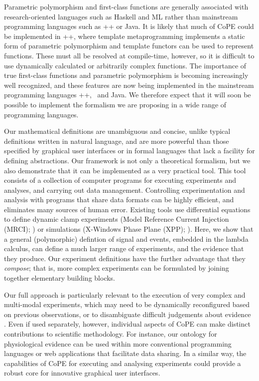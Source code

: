 Parametric polymorphism and first-class functions are generally
associated with research-oriented languages such as Haskell and ML
rather than mainstream programming languages such as \C++ or Java. It
is likely that much of CoPE could be implemented in \C++, where
template metaprogramming implements a static form of parametric
polymorphism and template functors can be used to represent
functions. These must all be resolved at compile-time, however, so it
is difficult to use dynamically calculated or arbitrarily complex
functions. The importance of true first-class functions and parametric
polymorphism is becoming increasingly well recognized, and these
features are now being implemented in the mainstream programming
languages \C++, \Csharp\, and Java. We therefore expect that it will
soon be possible to implement the formalism we are proposing in a wide
range of programming languages.

%
% 
%
Our mathematical definitions are unambiguous and concise, unlike
typical definitions written in natural language, and are more powerful
than those specified by graphical user interfaces or in formal
languages that lack a facility for defining abstractions. Our
framework is not only a theoretical formalism, but we also demonstrate
that it can be implemented as a very practical tool. This tool
consists of a collection of computer programs for executing
experiments and analyses, and carrying out data
management. Controlling experimentation and analysis with programs
that share data formats can be highly efficient, and eliminates many
sources of human error. Existing tools use differential equations to
define dynamic clamp experiments (Model Reference Current Injection
(MRCI); \citep{Raikov2004}) or simulations (X-Windows Phase Plane
(XPP); \citep{Ermentrout1987}). Here, we show that a general
(polymorphic) defintion of signal and events, embedded in the lambda
calculus, can define a much larger range of experiments, and the
evidence that they produce. Our experiment definitions have the
further advantage that they \emph{compose}; that is, more complex
experiments can be formulated by joining together elementary building
blocks.

Our full approach is particularly relevant to the execution of very
complex and multi-modal experiments, which may need to be dynamically
reconfigured based on previous observations, or to disambiguate
difficult judgements about evidence \citep{Kriegeskorte2009}. Even
if used separately, however, individual aspects of CoPE can make
distinct contributions to scientific methodology. For instance, our
ontology for physiological evidence can be used within more
conventional programming languages or web applications that facilitate
data sharing. In a similar way, the capabilities of CoPE for executing
and analysing experiments could provide a robust core for innovative
graphical user interfaces.

